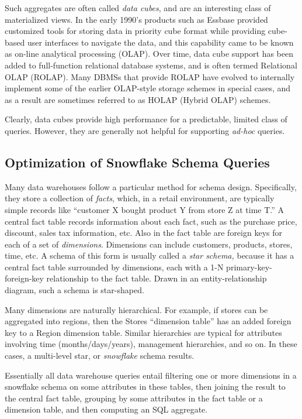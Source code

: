 \documentclass[a4paper,11pt,twoside,openright]{book}
\begin{document}
Such aggregates are often called \emph{data cubes}, and are an
interesting class of materialized views. In the early 1990's products
such as Essbase provided customized tools for storing data in priority
cube format while providing cube-based user interfaces to navigate the
data, and this capability came to be known as on-line analytical
processing (OLAP). Over time, data cube support has been added to
full-function relational database systems, and is often termed
Relational OLAP (ROLAP). Many DBMSs that provide ROLAP have evolved to
internally implement some of the earlier OLAP-style storage schemes in
special cases, and as a result are sometimes referred to as HOLAP
(Hybrid OLAP) schemes.

Clearly, data cubes provide high performance for a predictable, limited
class of queries. However, they are generally not helpful for
supporting \emph{ad-hoc} queries.

\hypertarget{optimization-of-snowflake-schema-queries}{%
\subsection{Optimization of Snowflake Schema
Queries}\label{optimization-of-snowflake-schema-queries}}

Many data warehouses follow a particular method for schema design.
Specifically, they store a collection of \emph{facts}, which, in a
retail environment, are typically simple records like ``customer X
bought product Y from store Z at time T.'' A central fact table records
information about each fact, such as the purchase price, discount, sales
tax information, etc. Also in the fact table are foreign keys for each
of a set of \emph{dimensions}. Dimensions can include customers,
products, stores, time, etc. A schema of this form is usually called a
\emph{star schema,} because it has a central fact table surrounded by
dimensions, each with a 1-N primary-key-foreign-key relationship to the
fact table. Drawn in an entity-relationship diagram, such a schema is
star-shaped.

Many dimensions are naturally hierarchical. For example, if stores can
be aggregated into regions, then the Stores ``dimension table'' has an
added foreign key to a Region dimension table. Similar hierarchies are
typical for attributes involving time (months/days/years), management
hierarchies, and so on. In these cases, a multi-level star, or
\emph{snowflake} schema results.

Essentially all data warehouse queries entail filtering one or more
dimensions in a snowflake schema on some attributes in these tables,
then joining the result to the central fact table, grouping by some
attributes in the fact table or a dimension table, and then computing an
SQL aggregate.
\end{document}
